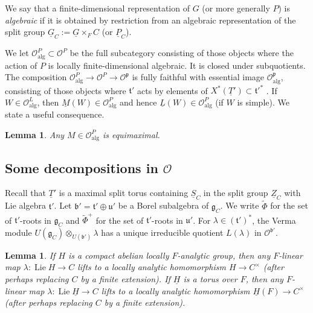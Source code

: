 \documentclass[a4paper]{amsart}
\numberwithin{equation}{section}
\newtheorem{lem}[thm]{Lemma}
\theoremstyle{remark}
\theoremstyle{definition}
\DeclareMathOperator{\Lie}{Lie}
\newcommand{\alggrp}[1]{\underline{#1}}
\newcommand{\alg}{\mathrm{alg}}
\begin{document}
We say that a finite-dimensional representation of $G$ (or more generally $P$) is \emph{algebraic} if it is obtained by restriction
from an algebraic representation of the split group $\alggrp{G}_{C} := \alggrp{G}\times_{F}C$ (or $\alggrp{P}_{C}$).

We let $\mathcal O^P_\alg \subset \mathcal O^P$ be the full subcategory consisting of those objects where the action of $P$ is locally finite-dimensional algebraic.
It is closed under subquotients.
The composition $\mathcal O^P_\alg \to \mathcal O^P \to \mathcal O^{\mathfrak p}$ is fully faithful with essential image $\mathcal O_\alg^{\mathfrak p}$, consisting of those objects where $\mathfrak t'$ acts by elements of $X^*(\alggrp T') \subset \mathfrak t'^*$ \cite[\S2, Lemma 3.2]{OS2}.
If $W \in \mathcal O^L_\alg$, then $\underline M(W) \in \mathcal O^P_\alg$ and hence $\underline L(W) \in \mathcal O^P_\alg$ (if $W$ is simple).
We state a useful consequence.

\begin{lem}\label{lem:alg-equimax}
  Any $M \in \mathcal O^P_\alg$ is equimaximal.
\end{lem}

\subsection{Some decompositions in \texorpdfstring{$\mathcal{O}$}{O}}
\label{sec:some-decomp}
Recall that $\alggrp{T}'$ is a maximal split torus containing $\alggrp{S}_C$ in the split group $\alggrp{Z}_C$ with Lie algebra $\mathfrak{t}'$.
Let $\mathfrak{b}' = \mathfrak{t}'\oplus\mathfrak{u}'$ be a Borel subalgebra of $\mathfrak{g}_{C}$.
We write $\widetilde{\Phi}$ for the set of $\mathfrak{t}'$-roots in $\mathfrak{g}_{C}$ and $\widetilde{\Phi}^{+}$ for the set of $\mathfrak{t}'$-roots in $\mathfrak{u}'$.
For $\lambda\in (\mathfrak{t}')^{*}$, the Verma module $U(\mathfrak{g}_{C})\otimes_{U(\mathfrak{b}')}\lambda$ has a unique irreducible quotient $L(\lambda)$ in $\mathcal O^{\mathfrak{b}'}$.

\begin{lem}\label{lem:extend-char}
  If $H$ is a compact abelian locally $F$-analytic group, then any $F$-linear map $\lambda \colon  \Lie H \to C$ lifts
  to a locally analytic homomorphism $H \to C^{\times}$ (after perhaps replacing $C$ by a finite extension).
  If $\alggrp{H}$ is a torus over $F$, then any $F$-linear map $\lambda \colon \Lie \alggrp{H} \to C$ lifts to a locally analytic
  homomorphism $\alggrp{H}(F) \to C^{\times}$ (after perhaps replacing $C$ by a finite extension).
\end{lem}
\end{document}
